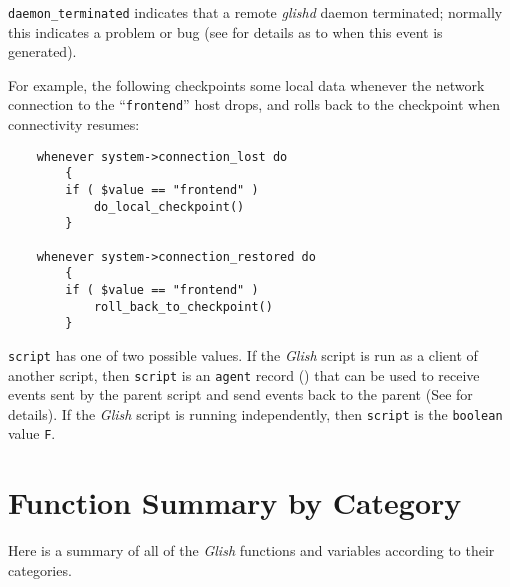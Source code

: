 \begin{sloppy}
\begin{list}{}{}
\begin{list}{}{}
\item[{\tt daemon\_terminated}]
indicates that a remote {\em glishd} daemon terminated; normally this
indicates a problem or bug (see  for details
as to when this event is generated).

\end{list}

For example, the following checkpoints some local data whenever the
network connection to the ``{\tt frontend}'' host drops, and rolls
back to the checkpoint when connectivity resumes:
\begin{verbatim}
    whenever system->connection_lost do
        {
        if ( $value == "frontend" )
            do_local_checkpoint()
        }

    whenever system->connection_restored do
        {
        if ( $value == "frontend" )
            roll_back_to_checkpoint()
        }
\end{verbatim}

\item[{\tt script}] \label{script-var} 
has one of two possible values.  If the {\em Glish} 
script is run as a
client of another script, then {\tt script} is an {\tt agent} record
() that can be used to receive events sent by the parent
script and send events back to the parent (See  for details).
If the {\em Glish} script is running independently, then {\tt script} is
the {\tt boolean} value {\tt F}.

\end{list}
\end{sloppy}

\section{Function Summary by Category}

Here is a summary of  all of the {\em Glish} functions and 
variables according
to their categories.

